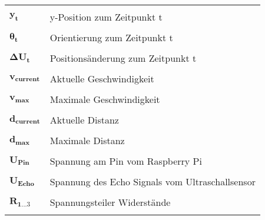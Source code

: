\documentclass[12pt,a4paper]{scrreprt}
\begin{document}
\begin{longtable}[l]{p{2cm} l}
					            &									                \\
$\boldsymbol{y_{t}}$            & y-Position zum Zeitpunkt t	                    \\
					            &									                \\
$\boldsymbol{\theta_{t}}$       & Orientierung zum Zeitpunkt t	                    \\
					            &									                \\
$\boldsymbol{\Delta U_{t}}$     & Positionsänderung zum Zeitpunkt t	                \\
					            &									                \\
$\boldsymbol{v_{current}}$      & Aktuelle Geschwindigkeit	                        \\
					            &									                \\
$\boldsymbol{v_{max}}$          & Maximale Geschwindigkeit	                        \\
					            &									                \\
$\boldsymbol{d_{current}}$      & Aktuelle Distanz	                                \\
					            &									                \\
$\boldsymbol{d_{max}}$          & Maximale Distanz	                                \\
					            &									                \\
$\boldsymbol{U_{Pin}}$          & Spannung am Pin vom Raspberry Pi                  \\
					            &									                \\
$\boldsymbol{U_{Echo}}$         & Spannung des Echo Signals vom Ultraschallsensor   \\
					            &									                \\
$\boldsymbol{R_{1...3}}$        & Spannungsteiler Widerstände                       \\
					            &									                \\
\end{longtable}

\newpage








% 
% 
% 
% 
\end{document}
